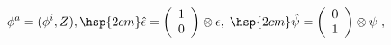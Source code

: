 \begin{equation}
\phi^a = (\phi^i, Z), \hsp{2cm}
\hat{\epsilon}=\left(\begin{array}{c}1\\0\end{array}\right)\otimes\epsilon, \; \hsp{2cm}
\hat{\psi}=\left(\begin{array}{c}0\\1\end{array}\right)\otimes\psi\; ,
\end{equation}

